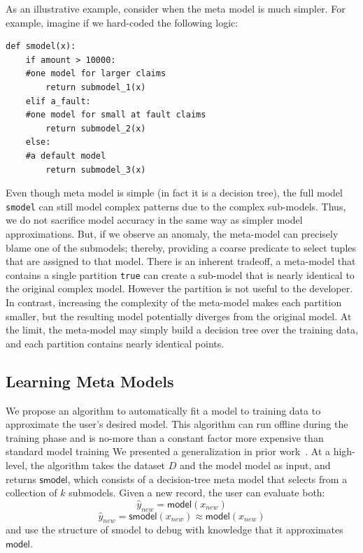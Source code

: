 As an illustrative example, consider when the meta model is much simpler.
For example, imagine if we hard-coded the following logic:
\begin{lstlisting}
def smodel(x):
    if amount > 10000:
    #one model for larger claims
        return submodel_1(x)
    elif a_fault:
    #one model for small at fault claims
        return submodel_2(x)
    else:
    #a default model
        return submodel_3(x)
\end{lstlisting}
Even though meta model is simple (in fact it is a decision tree), the full model \texttt{smodel} can still model complex patterns due to the complex sub-models.  Thus, we do not sacrifice model accuracy in the same way as simpler model approximations.
But, if we observe an anomaly, the meta-model can precisely blame one of the submodels; thereby, providing a coarse predicate to select tuples that are assigned to that model.
There is an inherent tradeoff, a meta-model that contains a single partition \texttt{true} can create a sub-model that is nearly identical to the original complex model. However the partition is not useful to the developer.  In contrast, increasing the complexity of the meta-model makes each partition smaller, but the resulting model potentially diverges from the original model.  At the limit, the meta-model may simply build a decision tree over the training data, and each partition contains nearly identical points.

\subsection{Learning Meta Models} 
We propose an algorithm to automatically fit a \sys model to training data to approximate the user's desired model.
This algorithm can run offline during the training phase and is no-more than a constant factor more expensive than standard model training
We presented a generalization in prior work~\cite{DBLP:journals/corr/KrishnanGLMPG16, krishnan17}. 
At a high-level, the algorithm takes the dataset $D$ and the model \textsf{model} as input, and returns $\textsf{smodel}$, which consists of a decision-tree meta model that selects from a collection of $k$ submodels. Given a new record, the user can evaluate both:
\[
\hat{y}_{new} = \textsf{model}(x_{new})
\]
\[
\hat{y}_{new} = \textsf{smodel}(x_{new}) \approx \textsf{model}(x_{new})
\]
and use the structure of \textsf{smodel} to debug with knowledge that it approximates $\textsf{model}$.

